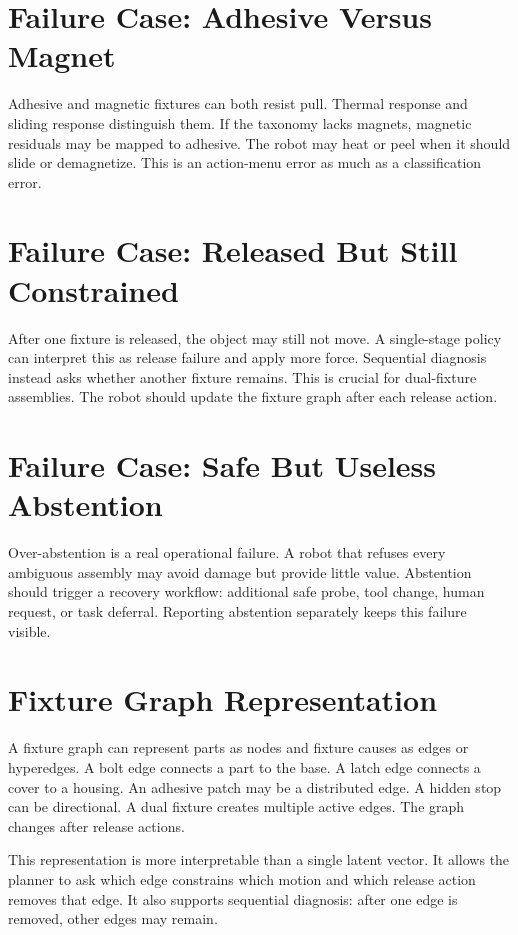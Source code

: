 \documentclass{article}
\begin{document}
\section{Failure Case: Adhesive Versus Magnet}

Adhesive and magnetic fixtures can both resist pull. Thermal response and
sliding response distinguish them. If the taxonomy lacks magnets, magnetic
residuals may be mapped to adhesive. The robot may heat or peel when it should
slide or demagnetize. This is an action-menu error as much as a classification
error.

\section{Failure Case: Released But Still Constrained}

After one fixture is released, the object may still not move. A single-stage
policy can interpret this as release failure and apply more force. Sequential
diagnosis instead asks whether another fixture remains. This is crucial for
dual-fixture assemblies. The robot should update the fixture graph after each
release action.

\section{Failure Case: Safe But Useless Abstention}

Over-abstention is a real operational failure. A robot that refuses every
ambiguous assembly may avoid damage but provide little value. Abstention should
trigger a recovery workflow: additional safe probe, tool change, human request,
or task deferral. Reporting abstention separately keeps this failure visible.

\section{Fixture Graph Representation}

A fixture graph can represent parts as nodes and fixture causes as edges or
hyperedges. A bolt edge connects a part to the base. A latch edge connects a
cover to a housing. An adhesive patch may be a distributed edge. A hidden stop
can be directional. A dual fixture creates multiple active edges. The graph
changes after release actions.

This representation is more interpretable than a single latent vector. It
allows the planner to ask which edge constrains which motion and which release
action removes that edge. It also supports sequential diagnosis: after one edge
is removed, other edges may remain.
\end{document}
